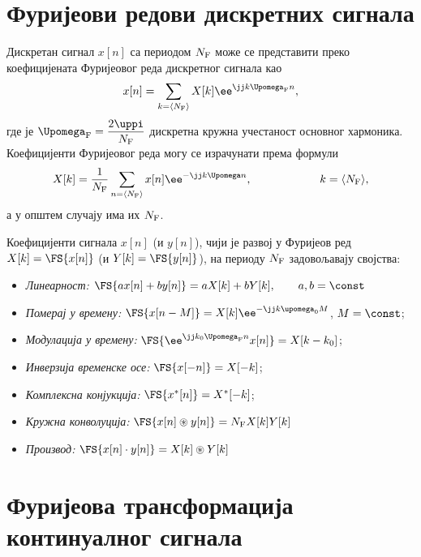 \section*{Фуријеови редови дискретних сигнала}

Дискретан сигнал $x[n]$ са периодом $N_{\rm F}$ може се представити преко коефицијената Фуријеовог 
реда дискретног сигнала као
\begin{eqnarray}
    x[n] = \sum_{k = \langle N_{\rm F} \rangle } X[k] \ee^{ \jj k \Upomega_{\rm F} n }, 
\end{eqnarray}
где је $\Upomega_{\rm F} = \dfrac{2\uppi}{N_{\rm F}}$ дискретна кружна учестаност основног хармоника. Коефицијенти 
Фуријеовог реда могу се израчунати према формули 
\begin{equation}
    X[k] = \dfrac{1}{N_{\rm F}} \sum_{n = \langle N_{\rm F} \rangle} x[n] \ee^{-\jj k \Upomega n}, 
    \qquad\qquad\qquad
    k = \langle N_{\rm F} \rangle,
\end{equation}
а у општем случају има их $N_{\rm F}$. 

Коефицијенти сигнала $x[n]$ (и $y[n]$), чији је развој у Фуријеов ред
$X[k] = \FS{x[n]}$ (и $Y[k] = \FS{y[n]}$), на периоду $N_{\rm F}$ задовољавају својства:
\begin{itemize}\itemsep0pt
    \item \emph{Линеарност:} $\FS{a x[n] + b y[n]} = a X[k] + b Y[k], \qquad a,b = \const$ \hfill \Svojstvo
    \item \emph{Померај у времену: }
    $ \FS{x[n-M]} = X[k] \ee^{-\jj k \upomega_{\rm 0} M}$, $M = \const$; \hfill \Svojstvo
    \item \emph{Модулација у времену:}
    $ \FS{\ee^{\jj k_0 \Upomega_{\rm F} n } x[n] } = 
    X[k - k_0]$; \hfill \Svojstvo
    \item \emph{Инверзија временске осе:}
    $\FS{x[-n]} = X[-k] $; \hfill \Svojstvo
    \item \emph{Комплексна конјукција:}
    $\FS{x^{\ast}[n] } = X^{\ast} [-k]$; \hfill \Svojstvo
    \item \emph{Кружна конволуција:}
    $\FS{x[n] \circledast y[n] } = N_{\rm F} X[k] Y[k]$ \hfill \Svojstvo
    \item \emph{Производ:}
    $\FS{x[n] \cdot y[n]} = X[k] \circledast Y[k]$ \hfill \Svojstvo
\end{itemize}



\section*{Фуријеова трансформација континуалног сигнала} \label{d:CTFT}

